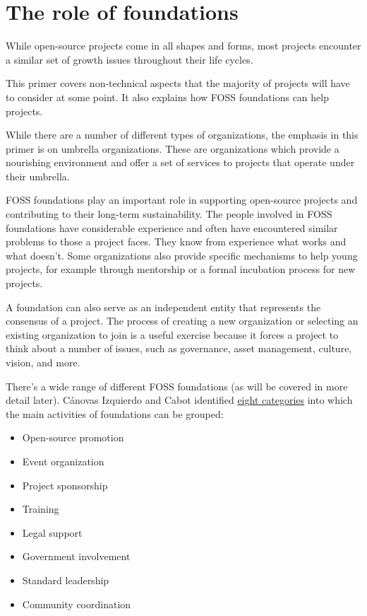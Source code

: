 


\chapter{The role of foundations}

While open-source projects come in all shapes and forms, most projects encounter a similar set of growth issues throughout their life cycles.

This primer covers non-technical aspects that the majority of projects will have to consider at some point.  It also explains how FOSS foundations can help projects.

While there are a number of different types of organizations, the emphasis in this primer is on umbrella organizations.  These are organizations which provide a nourishing environment and offer a set of services to projects that operate under their umbrella.

FOSS foundations play an important role in supporting open-source projects and contributing to their long-term sustainability.  The people involved in FOSS foundations have considerable experience and often have encountered similar problems to those a project faces.  They know from experience what works and what doesn't.  Some organizations also provide specific mechanisms to help young projects, for example through mentorship or a formal incubation process for new projects.

A foundation can also serve as an independent entity that represents the consensus of a project.  The process of creating a new organization or selecting an existing organization to join is a useful exercise because it forces a project to think about a number of issues, such as governance, asset management, culture, vision, and more.

There's a wide range of different FOSS foundations (as will be covered in more detail later).  Cánovas Izquierdo and Cabot identified \href{https://doi.org/10.1145/3183428.3183438}{eight categories} into which the main activities of foundations can be grouped:

\begin{itemize}

\item Open-source promotion

\item Event organization

\item Project sponsorship

\item Training

\item Legal support

\item Government involvement

\item Standard leadership

\item Community coordination

\end{itemize}

